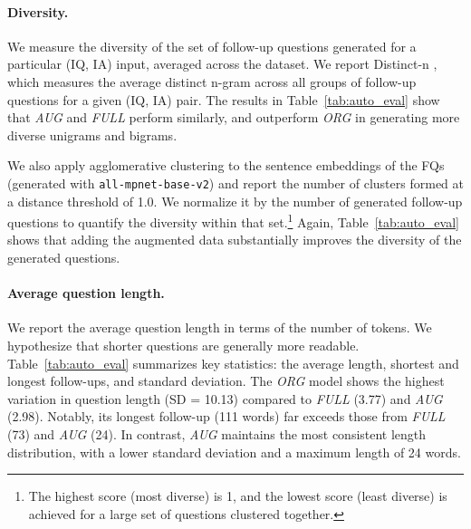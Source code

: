 \paragraph{Diversity.} We measure the diversity of the set of follow-up questions generated for a particular (IQ, IA) input, averaged across the dataset. We report Distinct-n \cite{li-etal-2016-diversity}, which measures the average distinct n-gram across all groups of follow-up questions for a given (IQ, IA) pair. 
The results in Table~\ref{tab:auto_eval} show that \textit{AUG} and \textit{FULL} perform similarly, and outperform \textit{ORG} in generating more diverse unigrams and bigrams. 

We also apply agglomerative clustering to the sentence embeddings of the FQs (generated with \texttt{all-mpnet-base-v2}) and report the number of clusters formed at a distance threshold of 1.0. We normalize it by the number of generated follow-up questions to quantify the diversity within that set.\footnote{The highest score (most diverse) is 1, and the lowest score (least diverse) is achieved for a large set of questions clustered together.} Again, Table~\ref{tab:auto_eval} shows that adding the augmented data substantially improves the diversity of the generated questions. 

\paragraph{Average question length.} We report the average question length in terms of the number of tokens. We hypothesize that shorter questions are generally more readable. Table~\ref{tab:auto_eval} summarizes key statistics: the average length, shortest and longest follow-ups, and standard deviation. The \textit{ORG} model shows the highest variation in question length (SD = 10.13) compared to \textit{FULL} (3.77) and \textit{AUG} (2.98). Notably, its longest follow-up (111 words) far exceeds those from \textit{FULL} (73) and \textit{AUG} (24). In contrast, \textit{AUG} maintains the most consistent length distribution, with a lower standard deviation and a maximum length of 24 words. 

